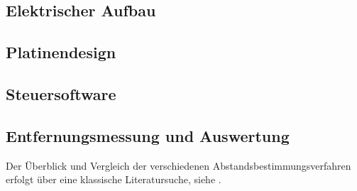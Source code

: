 \subsection{Elektrischer Aufbau}

\begin{comment}
Wie lange halten die Batterien durch?
	- 4.7 m, LOS, Start 13:50-23:50, 12:50-20:00
\end{comment}


\begin{comment}
------------------------------------------------------------------------------------------
\end{comment}
\subsection{Platinendesign}

\begin{comment}
\end{comment}


\begin{comment}
------------------------------------------------------------------------------------------
\end{comment}
\subsection{Steuersoftware}


\begin{comment}
------------------------------------------------------------------------------------------
\end{comment}
\subsection{Entfernungsmessung und Auswertung}

\begin{comment}
- Mit welchen Einstellungen kommt man auf die Entfernungsmessung?
- Streuung?
- LOS/NLOS {Holz, Bücher, Menschlicher Körper}
	- Welcher Fehler ergibt zwischen LOS/NLOS?
- Wie verändert sich die Genauigkeit der Entfernungsmessung bei einer direkten Sichtverbindung (engl. Line--of--sight (LOS)) und indirekten Sichtverbindung (engl. Non--line--of--sight (NLOS))?
\end{comment}

Der Überblick und Vergleich der verschiedenen Abstandsbestimmungsverfahren erfolgt über eine klassische Literatursuche, siehe \cite{lee2007comparative, herranz2010studying, zekavat2011handbook}.


